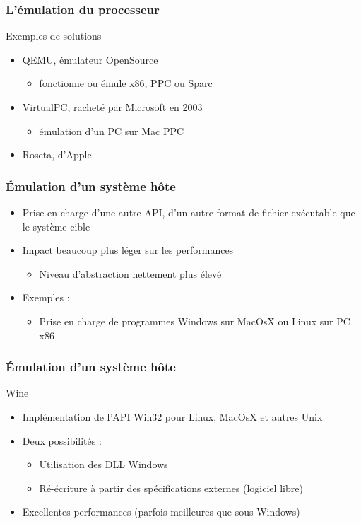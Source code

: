 \begin{frame}
\frametitle{L’émulation du processeur}
\begin{exampleblock}{Exemples de solutions}
\begin{itemize}
\item QEMU, émulateur OpenSource
\begin{itemize}
\item fonctionne ou émule x86, PPC ou Sparc
\end{itemize}
\item VirtualPC, racheté par Microsoft en 2003
\begin{itemize}
\item émulation d'un PC sur Mac PPC
\end{itemize}
\item Roseta, d'Apple
\end{itemize}
\end{exampleblock}
\end{frame}

\begin{frame}
\frametitle{Émulation d'un système hôte}
\begin{itemize}
\item Prise en charge d'une autre API, d'un autre format de fichier exécutable que le système cible
\item Impact beaucoup plus léger sur les performances
\begin{itemize}
\item Niveau d'abstraction nettement plus élevé
\end{itemize}
\item Exemples : 
\begin{itemize}
\item Prise en charge de programmes Windows sur MacOsX ou Linux sur PC x86
\end{itemize}
\end{itemize}
\end{frame}

\begin{frame}
\frametitle{Émulation d'un système hôte}
\begin{exampleblock}{Wine} 
\begin{itemize}
\item Implémentation de l'API Win32 pour Linux, MacOsX et autres Unix
\item Deux possibilités :
\begin{itemize}
\item Utilisation des DLL Windows 
\item Ré-écriture à partir des spécifications externes (logiciel libre)
\end{itemize}
\item Excellentes performances (parfois meilleures que sous Windows)
\end{itemize}
\end{exampleblock}
\end{frame}

